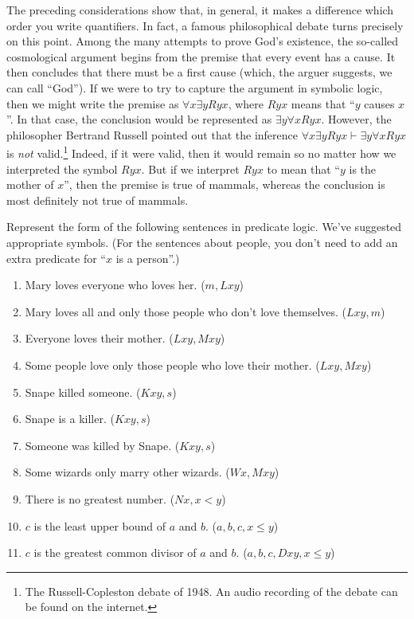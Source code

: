 The preceding considerations show that, in general, it makes a
difference which order you write quantifiers.  In fact, a famous
philosophical debate turns precisely on this point.  Among the many
attempts to prove God's existence, the so-called cosmological argument
begins from the premise that every event has a cause.  It then
concludes that there must be a first cause (which, the arguer
suggests, we can call ``God'').  If we were to try to capture the
argument in symbolic logic, then we might write the premise as
$\forall x\exists yRyx$, where $Ryx$ means that ``$y$ causes $x$''.
In that case, the conclusion would be represented as
$\exists y\forall xRyx$.  However, the philosopher Bertrand Russell
pointed out that the inference
$\forall x\exists yRyx\vdash \exists y\forall xRyx$ is {\it not}
valid.\footnote{The Russell-Copleston debate of 1948.  An audio
  recording of the debate can be found on the internet.}  Indeed, if
it were valid, then it would remain so no matter how we interpreted
the symbol $Ryx$.  But if we interpret $Ryx$ to mean that ``$y$ is the
mother of $x$'', then the premise is true of mammals, whereas the
conclusion is most definitely not true of mammals.


\begin{exercises} Represent the form of the following sentences in
  predicate logic.  We've suggested appropriate symbols.  (For the
  sentences about people, you don't need to add an extra predicate for
  ``$x$ is a person''.)
  \begin{enumerate}
  \item Mary loves everyone who loves her. ($m,Lxy$)
  \item Mary loves all and only those people who don't love
    themselves. ($Lxy,m$)
  \item Everyone loves their mother.  ($Lxy,Mxy$)
  \item Some people love only those people who love their
    mother. ($Lxy,Mxy$)
   \item Snape killed someone. ($Kxy,s$)
  \item Snape is a killer.  ($Kxy,s$)  
  \item Someone was killed by Snape. ($Kxy,s$)
  \item Some wizards only marry other wizards.  ($Wx,Mxy$) 
  \item There is no greatest number. ($Nx,x<y$)
  \item $c$ is the least upper bound of $a$ and $b$.  ($a,b,c,x\leq y$)
  \item $c$ is the greatest common divisor of $a$ and $b$.
    ($a,b,c,Dxy,x\leq y$)
   \end{enumerate} \end{exercises}


